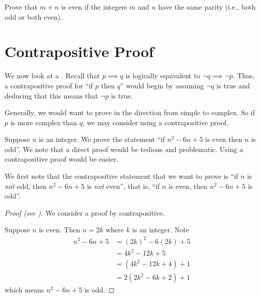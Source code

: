 \begin{exercise}
    Prove that $m + n$ is even if the integers $m$ and $n$ have the same parity (i.e., both odd or both even).
\end{exercise}

\section{Contrapositive Proof}
We now look at a . Recall that $p \implies q$ is logically equivalent to $\lnot q \implies \lnot p$. Thus, a contrapositive proof for ``if $p$ then $q$'' would begin by assuming $\lnot q$ is true and deducing that this means that $\lnot p$ is true.

Generally, we would want to prove in the direction from simple to complex. So if $p$ is more complex than $q$, we may consider using a contrapositive proof.

\begin{example}\label{example-if-(n-1)(n-5)-is-even-then-n-is-odd}
    Suppose $n$ is an integer. We prove the statement ``if $n^2 - 6n + 5$ is even then $n$ is odd''. We note that a direct proof would be tedious and problematic. Using a contrapositive proof would be easier.

    We first note that the contrapositive statement that we want to prove is ``if $n$ is \textit{not} odd, then $n^2 - 6n + 5$ is \textit{not} even'', that is, ``if $n$ is even, then $n^2 - 6n + 5$ is odd''.
    \begin{proof}[Proof (see {\cite[p.~130]{hammack_2018}})]
        We consider a proof by contrapositive.

        Suppose $n$ is even. Then $n = 2k$ where $k$ is an integer. Note
        \begin{align*}
            n^2 - 6n + 5 &= (2k)^2 - 6(2k) + 5\\
            &= 4k^2 - 12k + 5\\
            &= (4k^2 - 12k + 4) + 1\\
            &= 2(2k^2 - 6k + 2) + 1
        \end{align*}
        which means $n^2 - 6n + 5$ is odd.
    \end{proof}
\end{example}

